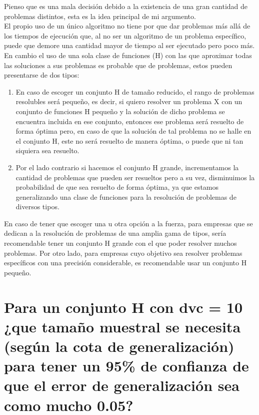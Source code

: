 Pienso que es una mala decisión debido a la existencia de una gran cantidad de problemas distintos, esta es la idea principal de mi argumento.\\

El propio uso de un único algoritmo no tiene por que dar problemas más allá de los tiempos de ejecución que, al no ser un algoritmo de un problema específico, puede que demore una cantidad mayor de tiempo al ser ejecutado pero poco más.\\
 En cambio el uso de una sola clase de funciones (H) con las que aproximar todas las soluciones a sus problemas es probable que de problemas, estos pueden presentarse de dos tipos:

\begin{enumerate}
	\item En caso de escoger un conjunto H de tamaño reducido, el rango de problemas resolubles será pequeño, es decir, si quiero resolver un problema X con un conjunto de funciones H pequeño y la solución de dicho problema se encuentra incluida en ese conjunto, entonces ese problema será resuelto de forma óptima pero, en caso de que la solución de tal problema no se halle en el conjunto H, este no será resuelto de manera óptima, o puede que ni tan siquiera sea resuelto.
	\item Por el lado contrario si hacemos el conjunto H grande, incrementamos la cantidad de problemas que pueden ser resueltos pero a su vez, disminuimos la probabilidad de que sea resuelto de forma óptima, ya que estamos generalizando una clase de funciones para la resolución de problemas de diversos tipos.
\end{enumerate}

En caso de tener que escoger una u otra opción a la fuerza, para empresas que se dedican a la resolución de problemas de una amplia gama de tipos, sería recomendable tener un conjunto H grande con el que poder resolver muchos problemas. Por otro lado, para empresas cuyo objetivo sea resolver problemas específicos con una precisión considerable, es recomendable usar un conjunto H pequeño.



\section{Para un conjunto H con dvc = 10  ¿que tamaño muestral se necesita (según la cota de generalización)  para tener un 95\% de confianza de que el error de generalización sea como mucho 0.05?}


